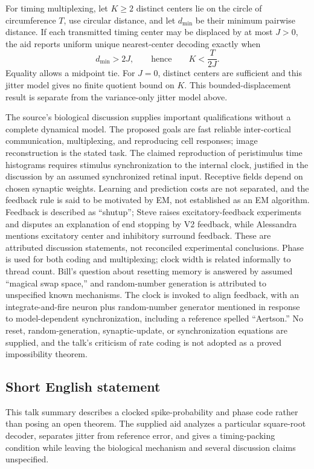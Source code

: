 \documentclass[11pt]{article}
\begin{document}
For timing multiplexing, let \(K\ge2\) distinct centers lie on the circle of circumference \(T\), use circular distance, and let \(d_{\min}\) be their minimum pairwise distance. If each transmitted timing center may be displaced by at most \(J>0\), the aid reports uniform unique nearest-center decoding exactly when
\[
 d_{\min}>2J,
 \qquad\text{hence}\qquad K<\frac{T}{2J}.
\]
Equality allows a midpoint tie. For \(J=0\), distinct centers are sufficient and this jitter model gives no finite quotient bound on \(K\). This bounded-displacement result is separate from the variance-only jitter model above.

The source's biological discussion supplies important qualifications without a complete dynamical model. The proposed goals are fast reliable inter-cortical communication, multiplexing, and reproducing cell responses; image reconstruction is the stated task. The claimed reproduction of peristimulus time histograms requires stimulus synchronization to the internal clock, justified in the discussion by an assumed synchronized retinal input. Receptive fields depend on chosen synaptic weights. Learning and prediction costs are not separated, and the feedback rule is said to be motivated by EM, not established as an EM algorithm. Feedback is described as ``shutup''; Steve raises excitatory-feedback experiments and disputes an explanation of end stopping by V2 feedback, while Alessandra mentions excitatory center and inhibitory surround feedback. These are attributed discussion statements, not reconciled experimental conclusions. Phase is used for both coding and multiplexing; clock width is related informally to thread count. Bill's question about resetting memory is answered by assumed ``magical swap space,'' and random-number generation is attributed to unspecified known mechanisms. The clock is invoked to align feedback, with an integrate-and-fire neuron plus random-number generator mentioned in response to model-dependent synchronization, including a reference spelled ``Aertson.'' No reset, random-generation, synaptic-update, or synchronization equations are supplied, and the talk's criticism of rate coding is not adopted as a proved impossibility theorem.
\subsection{Short English statement}
This talk summary describes a clocked spike-probability and phase code rather than posing an open theorem. The supplied aid analyzes a particular square-root decoder, separates jitter from reference error, and gives a timing-packing condition while leaving the biological mechanism and several discussion claims unspecified.
\end{document}
